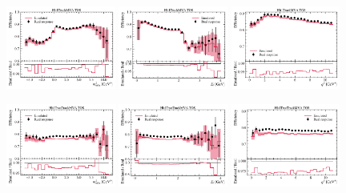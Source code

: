 \begin{figure}[ht]
    \centering
    \includegraphics[width=0.32\textwidth]{
        ./figs-mc-emulation/emulate-hlt1/b_Hlt1TrackMVA_TOS_mmiss2.pdf
    }
    \includegraphics[width=0.32\textwidth]{
        ./figs-mc-emulation/emulate-hlt1/b_Hlt1TrackMVA_TOS_el.pdf
    }
    \includegraphics[width=0.32\textwidth]{
        ./figs-mc-emulation/emulate-hlt1/b_Hlt1TrackMVA_TOS_q2.pdf
    }

    \includegraphics[width=0.32\textwidth]{
        ./figs-mc-emulation/emulate-hlt1/b_Hlt1TwoTrackMVA_TOS_mmiss2.pdf
    }
    \includegraphics[width=0.32\textwidth]{
        ./figs-mc-emulation/emulate-hlt1/b_Hlt1TwoTrackMVA_TOS_el.pdf
    }
    \includegraphics[width=0.32\textwidth]{
        ./figs-mc-emulation/emulate-hlt1/b_Hlt1TwoTrackMVA_TOS_q2.pdf
    }


\end{figure}
